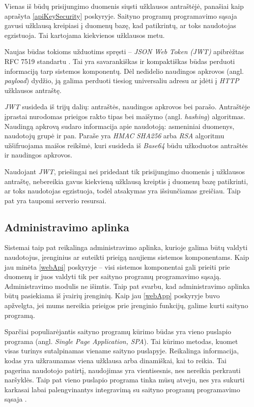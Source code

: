 \documentclass{VUMIFPSbakalaurinis}
\begin{document}
Vienas iš būdų prisijungimo duomenis siųsti užklausos antraštėjė, panašiai kaip aprašyta \ref{apiKeySecurity} poskyryje. Saityno programų programavimo sąsaja gavusi užklausą kreipiasi į duomenų bazę, kad patikrintų, ar toks naudotojas egzistuoja. Tai kartojama kiekvienos užklausos metu.

Naujas būdas tokioms užduotims spręsti – \textit{JSON Web Token (JWT)}  apibrėžtas RFC 7519 standartu \cite{jwtRef}. Tai yra savarankiškas ir kompaktiškas būdas perduoti informaciją tarp sistemos komponentų. Dėl nedidelio naudingos apkrovos (angl. \textit{payload}) dydžio, ją galima perduoti tiesiog universaliu adresu ar įdėti į \textit{HTTP} užklausos antraštę.

\textit{JWT} susideda iš trijų dalių: antraštės, naudingos apkrovos bei parašo. Antraštėje įprastai nurodomas prieigos rakto tipas bei maišymo (angl. \textit{hashing}) algoritmas. Naudingą apkrovą sudaro informacija apie naudotoją: asmeniniai duomenys, naudotojų grupė ir pan. Paraše yra \textit{HMAC SHA256} arba \textit{RSA} algoritmu užšifruojama maišos reikšmė, kuri susideda iš \textit{Base64} būdu užkoduotos antraštės ir naudingos apkrovos.

Naudojant \textit{JWT}, priešingai nei pridedant tik prisijungimo duomenis į užklausos antraštę, nebereikia gavus kiekvieną užklausą kreiptis į duomenų bazę patikrinti, ar toks naudotojas egzistuoja, todėl atsakymas yra išsiunčiamas greičiau. Taip pat yra taupomi serverio resursai. 

\subsection{Administravimo aplinka}

Sistemai taip pat reikalinga administravimo aplinka, kurioje galima būtų valdyti naudotojus, įrenginius ar suteikti prieigą naujiems sistemos komponentams. Kaip jau minėta \ref{webApi} poskyryje – visi sistemos komponentai gali prieiti prie duomenų ir juos valdyti tik per saityno programų programavimo sąsają. Administravimo modulis ne išimtis. Taip pat svarbu, kad administravimo aplinka būtų pasiekiama iš įvairių įrenginių. Kaip jau \ref{webApp} poskyryje buvo apžvelgta, jei mums nereikia prieigos prie įrenginio funkcijų, galime kurti saityno programą.

Sparčiai populiarėjantis saityno programų kūrimo būdas yra vieno puslapio programa (angl. \textit{Single Page Application, SPA}). Tai kūrimo metodas, kuomet visas turinys sutalpinamas viename saityno puslapyje. Reikalinga informacija, kodas yra užkraunamas viena užklausa arba dinamiškai, kai to reikia. Tai pagerina naudotojo patirtį, naudojimas yra vientisesnis, nes nereikia perkrauti naršyklės. Taip pat vieno puslapio programa tinka mūsų atveju, nes yra sukurti karkasai labai palengvinantys integravimą su saityno programų programavimo sąsaja \cite{spa}.
\end{document}
